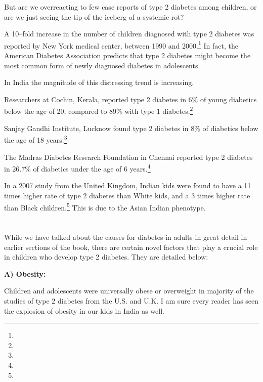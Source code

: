 But are we overreacting to few case reports of type 2 diabetes among children, or are we just seeing the tip of the iceberg of a systemic rot?

A 10–fold increase in the number of children diagnosed with type 2 diabetes was reported by New York medical center, between 1990 and 2000.\footnote{} In fact, the American Diabetes Association predicts that type 2 diabetes might become the most common form of newly diagnosed diabetes in adolescents.

In India the magnitude of this distressing trend is increasing.

\item Researchers at Cochin, Kerala, reported type 2 diabetes in 6\% of young diabetics below the age of 20, compared to 89\% with type 1 diabetes.\footnote{}

 \item Sanjay Gandhi Institute, Lucknow found type 2 diabetes in 8\% of diabetics below the age of 18 years.\footnote{}

 \item The Madras Diabetes Research Foundation in Chennai reported type 2 diabetes in 26.7\% of diabetics under the age of 6 years.\footnote{}

 \item In a 2007 study from the United Kingdom, Indian kids were found to have a 11 times higher rate of type 2 diabetes than White kids, and a 3 times higher rate than Black children.\footnote{} This is due to the Asian Indian phenotype.


\section*{}

While we have talked about the causes for diabetes in adults in great detail in earlier sections of the book, there are certain novel factors that play a crucial role in children who develop type 2 diabetes. They are detailed below:

\textbf{A) Obesity:}

Children and adolescents were universally obese or overweight in majority of the studies of type 2 diabetes from the U.S. and U.K. I am sure every reader has seen the explosion of obesity in our kids in India as well.

